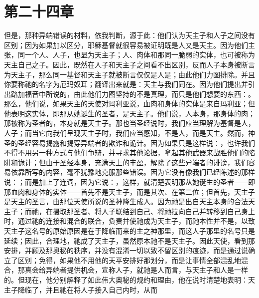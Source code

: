 
\section{第二十四章}

\par

但是，那种异端错误的材料，依我判断，源于此：他们认为天主子和人子之间没有区别；因为如果加以区分，耶稣基督就很容易被证明既是人又是天主。因为他们主张，同一个人、人子，也显为天主子；人、肉体和那同一脆弱的实体，也可被称为天主自己之子。因此，既然在人子和天主子之间看不出区别，反而人子本身被断言为天主子，那么同一基督和天主子就被断言仅仅是人是；由此他们力图排除。并且你要称祂的名字为厄玛奴耳；翻译出来就是：天主与我们同在。因为他们提出并引出路加福音中所说的，由此他们力图坚持的不是真理，而只是他们想要的东西：。那么，他们说，如果天主的天使对玛利亚说，血肉和身体的实体是来自玛利亚；但他表明这实体，即那从她诞生的圣者，是天主子。他们说，人本身，那身体的肉；那被称为圣者的，本身就是天主子。那也当圣经说时，我们应当理解为基督是人，人子；而当它向我们呈现天主子时，我们应当感知，不是人，而是天主。然而，神圣的圣经容易揭露和揭穿异端者的欺诈和诡计。因为如果只是这样说：，也许我们不得不用另一种方式与他们争辩，并寻求其他论据，拿起其他武器来战胜他们的陷阱和诡计；但由于圣经本身，充满天上的丰盈，解除了这些异端者的诽谤，我们容易依靠所写的内容，毫不犹豫地克服那些错误。因为它没有像我们已经陈述的那样说：；而是加上了连词，因为它说：，这样，就清楚表明那从她诞生的圣者——即那血肉和身体的实体——首先不是天主子，而是其次、在第二位；但首先，天主子是天主的圣言，由那位天使所说的圣神降生成人。因为祂是出自天主本身的合法天主子；而祂，在摄取那圣者、将人子联结到自己、将祂拉向自己并转移到自己身上时，通过祂的连接和混合的联合，负责并使祂成为天主子，而祂本性并不是，以致天主子这名号的原始原因是在于降临而来的主之神那里，而这人子那里的名号只是延续；因此，合理地，祂成了天主子，虽然原本祂不是天主子。因此天使，看到那安排，并顾及那奥秘的秩序，并没有混淆一切以致不留区别的痕迹，而是通过说确立了区别；免得，如果他不用他的天平安排好那划分，而是让事情全部混乱地混合，那真会给异端者提供机会，宣称人子，就祂是人而言，与天主子和人是一样的。但现在，他分别解释了如此伟大奥秘的规约和理由，他在说时清楚地表明：天主子降临了，并且祂在将人子接入自己内时，从而
